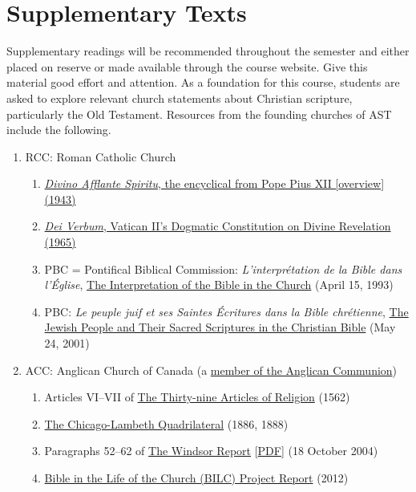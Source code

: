 \documentclass[titlepage]{article}
\begin{document}
\section{Supplementary Texts}
\label{supplementary}

Supplementary readings will be recommended throughout the semester and
either placed on reserve or made available through the course website.
Give this material good effort and attention. As a foundation for this
course, students are asked to explore relevant church statements about
Christian scripture, particularly the Old Testament. Resources from the
founding churches of AST include the following.

\begin{enumerate}

\item RCC: Roman Catholic Church

	\begin{enumerate}
	\item \href{}{\emph{Divino Afflante Spiritu}, the encyclical from Pope Pius XII [\href{http://www.bc.edu/schools/stm/crossroads/resources/deathofjesus/intro/the_catholic_approachtothebible.html}{overview}] (1943)}
	\item \href{}{\emph{Dei Verbum}, Vatican II's Dogmatic Constitution on Divine Revelation (1965)}
	\item PBC = Pontifical Biblical Commission: \emph{L'interprétation de la Bible dans l'Église}, \href{http://www.catholic-resources.org/ChurchDocs/PBC_Interp.htm}{The Interpretation of the Bible in the Church} (April 15, 1993)
	\item PBC: \emph{Le peuple juif et ses Saintes Écritures dans la Bible chrétienne}, \href{http://www.vatican.va/roman_curia/congregations/cfaith/pcb_documents/rc_con_cfaith_doc_20020212_popolo-ebraico_en.html}{The Jewish People and Their Sacred Scriptures in the Christian Bible} (May 24, 2001)
	\end{enumerate}

\item ACC: Anglican Church of Canada (a \href{https://www.anglicancommunion.org/structures/member-churches.aspx}{member of the Anglican Communion})

	\begin{enumerate}
	\item Articles VI–VII of \href{https://www.churchofengland.org/prayer-worship/worship/book-of-common-prayer/articles-of-religion.aspx}{The Thirty-nine Articles of Religion} (1562)
	\item \href{http://anglicansonline.org/basics/Chicago_Lambeth.html}{The Chicago-Lambeth Quadrilateral} (1886, 1888)
	\item Paragraphs 52–62 of \href{http://www.anglicancommunion.org/resources/document-library.aspx?author=The+Windsor+Process&language=English}{The Windsor Report} [\href{http://www.anglicancommunion.org/media/68225/windsor2004full.pdf}{PDF}] (18 October 2004)
	\item \href{http://www.anglicancommunion.org/media/98131/Final-Report-for-the-web.pdf}{Bible in the Life of the Church (BILC) Project Report} (2012)
	\end{enumerate}


\end{enumerate}
\end{document}
